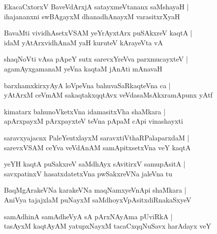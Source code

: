 \begin{shloka}
EkacaCxtorxV BaveVdArxjA satayxmeVtananx saMshayaH |\\
ihajananxni swBAgayxM dhanadhAnayxM varasitxrXyaH
\end{shloka}

\begin{shloka}
BavaMti vividhAsetxVSAM yeYrAyxtArx puSAkxreV kaqtA |\\
idaM yAtArxvidhAnaM yaH kuruteV kArayeVta vA 
\end{shloka}

\begin{shloka}
shaqNoVti vAsa pApeY sutx sarevxYreVva  parxmucayxteV |\\
agamAyxgamanaM yeVna kaqtaM jAnAti mAnavaH 
\end{shloka}

\begin{shloka}
barxhamxkirxyAyA loVpeVna bahuvaSaRkaqteVna ca |\\
yAtArxM ceVmAM sakaqtakxqqtAvx veVdasaMsAkxramApunx yAtf
\end{shloka}

\begin{shloka}
kimatarx bahunoVketxVna idamasitxVha shaMkara |\\
apArxpayxM pArxpayxteV teVna pApaM cApi vinashayxti
\end{shloka}

\begin{shloka}
saravxyajacnx PaleYsutxlayxM saravxtiVthaRPalaparxdaM |\\
sarevxVSAM ceYva  veVdAnAM samApitxsetxVna veY kaqtA
\end{shloka}

\begin{shloka}
yeYH kaqtA puSakxreV saMdhAyx sAvitirxV samupAsitA |\\
savxpatinxV hasatxdatetxVna pwSakxreVNa jaleVna tu
\end{shloka}

\begin{shloka}
BaqMgArakeVNa karakeVNa maqNamxyeVnApi shaMkara |\\
AniVya tajajxlaM puNayxM saMdhoyxVpAsitxdiRnakaSxyeV 
\end{shloka}

\begin{shloka}
samAdhinA samAdheVyA sA pArxNAyAma pUviRkA |\\
tasAyxM kaqtAyAM yatupxNayxM tacaCxqqNuSavx harAdayx veY
\end{shloka}

